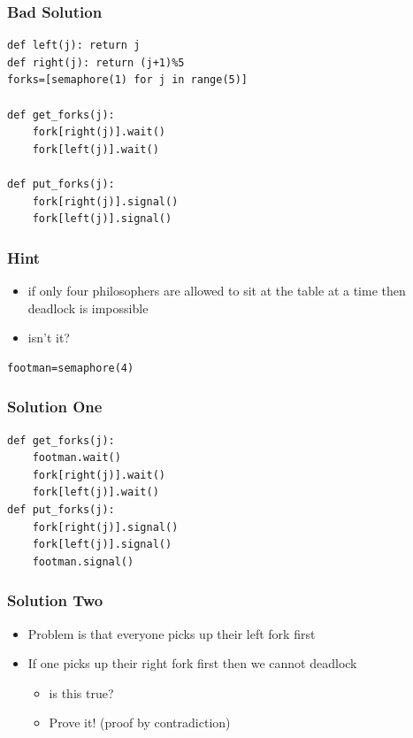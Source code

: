 \documentclass{beamer}
\begin{document}
\begin{frame}[fragile]
	\frametitle{Bad Solution}
\begin{verbatim}
def left(j): return j
def right(j): return (j+1)%5
forks=[semaphore(1) for j in range(5)]

def get_forks(j):
    fork[right(j)].wait()
    fork[left(j)].wait()

def put_forks(j):
    fork[right(j)].signal()
    fork[left(j)].signal()
\end{verbatim}
\end{frame}

\begin{frame}[fragile]
	\frametitle{Hint}
	\begin{itemize}
	\item if only four philosophers are allowed to sit at the table at a time then deadlock is impossible
\item isn’t it?
	\end{itemize}
	\begin{verbatim}
footman=semaphore(4)
\end{verbatim}

\end{frame}

\begin{frame}[fragile]
	\frametitle{Solution One}
	
\begin{verbatim}
def get_forks(j):
    footman.wait()
    fork[right(j)].wait()
    fork[left(j)].wait()
def put_forks(j):
    fork[right(j)].signal()
    fork[left(j)].signal()
    footman.signal()
\end{verbatim}
\end{frame}

\begin{frame}[fragile]
	\frametitle{Solution Two}
	\begin{itemize}
	\item Problem is that everyone picks up their left fork first
	\item If one picks up their right fork first then we cannot deadlock
\begin{itemize}
\item is this true?
\item Prove it! (proof by contradiction)
\end{itemize}

	\end{itemize}


\end{frame}
\end{document}

